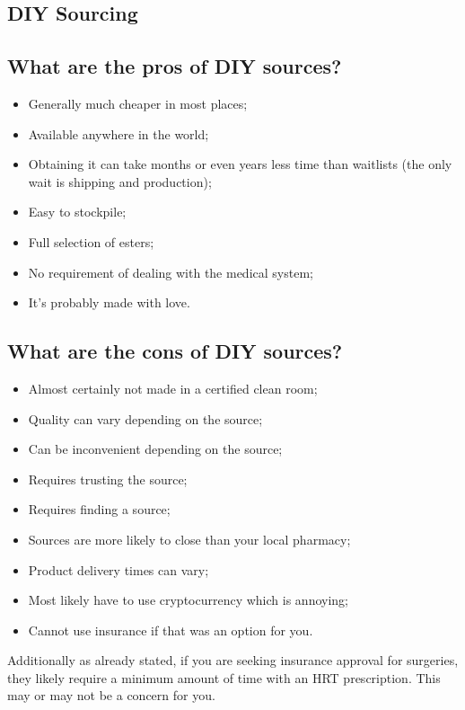 \documentclass{article}
\begin{document}
\subsection*{DIY Sourcing}

\subsection{What are the pros of DIY sources?}

\begin{itemize}
\item Generally much cheaper in most places;
\item Available anywhere in the world;
\item Obtaining it can take months or even years less time than waitlists (the only wait is shipping and production);
\item Easy to stockpile;
\item Full selection of esters;
\item No requirement of dealing with the medical system;
\item It’s probably made with love.
\end{itemize}

\subsection{What are the cons of DIY sources?}

\begin{itemize}
  \item Almost certainly not made in a certified clean room;
  \item Quality can vary depending on the source;
  \item Can be inconvenient depending on the source;
  \item Requires trusting the source;
  \item Requires finding a source;
  \item Sources are more likely to close than your local pharmacy;
  \item Product delivery times can vary;
  \item Most likely have to use cryptocurrency which is annoying;
  \item Cannot use insurance if that was an option for you.
\end{itemize}
Additionally as already stated, if you are seeking insurance approval for surgeries, they likely require a minimum amount of time with an HRT prescription. This may or may not be a concern for you.
\end{document}
